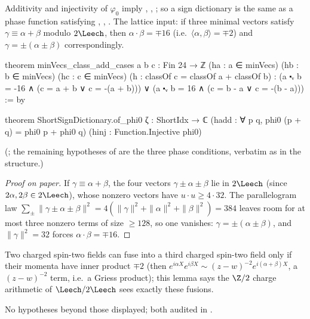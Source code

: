 \begin{theorem}\label{ch21:thm:ofphi0}
Additivity and injectivity of $\varphi_0$ imply , , ;
so a sign dictionary is the same as a phase function satisfying , ,
.  The lattice input: if three minimal vectors satisfy $\gamma\equiv\alpha+\beta$ modulo
$2\Leech$, then $\alpha\cdot\beta=\mp16$ (i.e.\ $\langle\alpha,\beta\rangle=\mp2$) and
$\gamma=\pm(\alpha\pm\beta)$ correspondingly.
\end{theorem}
\begin{leancode}
theorem minVecs_class_add_cases {a b c : Fin 24 → ℤ} (ha : a ∈ minVecs) (hb : b ∈ minVecs)
    (hc : c ∈ minVecs) (h : classOf c = classOf a + classOf b) :
    (a ⬝ᵥ b = -16 ∧ (c = a + b ∨ c = -(a + b))) ∨ (a ⬝ᵥ b = 16 ∧ (c = b - a ∨ c = -(b - a))) := by
\end{leancode}
\begin{leancode}
theorem ShortSignDictionary.of_phi0 {ζ : ShortIdx → ℂ}
    (hadd : ∀ p q, phi0 (p + q) = phi0 p + phi0 q) (hinj : Function.Injective phi0)
\end{leancode}
(; the remaining hypotheses of
 are the three phase conditions, verbatim as in the structure.)
\begin{proof}[Proof on paper]
If $\gamma\equiv\alpha+\beta$, the four vectors $\gamma\pm\alpha\pm\beta$ lie in $2\Leech$ (since
$2\alpha,2\beta\in2\Leech$), whose nonzero vectors have $u\cdot u\ge4\cdot32$.  The parallelogram law
$\sum_\pm\|\gamma\pm\alpha\pm\beta\|^2=4(\|\gamma\|^2+\|\alpha\|^2+\|\beta\|^2)=384$ leaves room for at most
three nonzero terms of size $\ge128$, so one vanishes: $\gamma=\pm(\alpha\pm\beta)$, and $\|\gamma\|^2=32$
forces $\alpha\cdot\beta=\mp16$.
\end{proof}
\begin{physics}
Two charged spin-two fields can fuse into a third charged spin-two field only if their momenta have
inner product $\mp2$ (then $e^{i\alpha X}e^{i\beta X}\sim(z-w)^{-2}e^{i(\alpha+\beta)X}$, a
$(z-w)^{-2}$ term, i.e.\ a Griess product); this lemma says the $\Z/2$ charge arithmetic of
$\Leech/2\Leech$ sees exactly these fusions.
\end{physics}
\begin{status}
No hypotheses beyond those displayed; both audited in .
\end{status}

